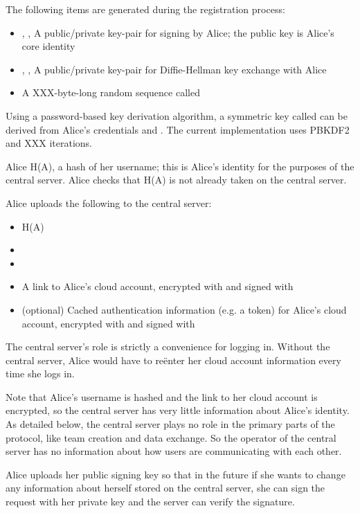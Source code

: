 \documentclass[pldi,10pt,preprint]{sigplanconf-pldi16}
\begin{document}
The following items are generated during the registration process:

\begin{itemize}
\item {}, , A public/private key-pair for signing by Alice; the public key is Alice's core identity
\item {}, , A public/private key-pair for Diffie-Hellman key exchange with Alice
\item A XXX-byte-long random sequence called 
\end{itemize}

Using a password-based key derivation algorithm, a symmetric key called  can be derived from Alice's credentials and .
The current implementation uses PBKDF2 and XXX iterations.

Alice H(A), a hash of her username; this is Alice's identity for the purposes of the central server.
Alice checks that H(A) is not already taken on the central server.

Alice uploads the following to the central server:

\begin{itemize}
\item H(A)
\item {}
\item {}
\item A link to Alice's cloud account, encrypted with  and signed with 
\item (optional) Cached authentication information (e.g. a token) for Alice's cloud account, encrypted with  and signed with 
\end{itemize}

The central server's role is strictly a convenience for logging in.
Without the central server, Alice would have to re\"{e}nter her cloud account information every time she logs in.

Note that Alice's username is hashed and the link to her cloud account is encrypted, so the central server has very little information about Alice's identity.
As detailed below, the central server plays no role in the primary parts of the protocol, like team creation and data exchange.
So the operator of the central server has no information about how users are communicating with each other.

Alice uploads her public signing key so that in the future if she wants to change any information about herself stored on the central server, she can sign the request with her private key and the server can verify the signature.
\end{document}
